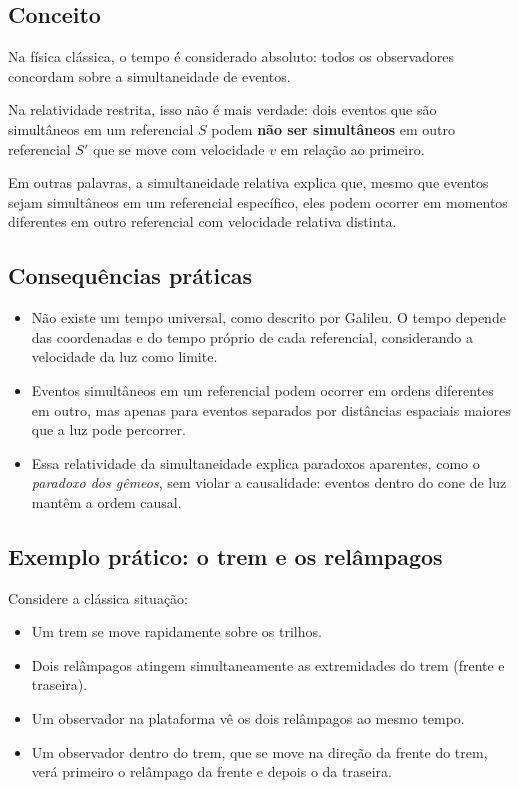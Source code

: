 \documentclass[12pt,a4paper]{article}
\begin{document}
\subsection{Conceito}

Na física clássica, o tempo é considerado absoluto: todos os observadores concordam sobre a simultaneidade de eventos.  

Na relatividade restrita, isso não é mais verdade: dois eventos que são simultâneos em um referencial $S$ podem \textbf{não ser simultâneos} em outro referencial $S'$ que se move com velocidade $v$ em relação ao primeiro.

Em outras palavras, a simultaneidade relativa explica que, mesmo que eventos sejam simultâneos em um referencial específico, eles podem ocorrer em momentos diferentes em outro referencial com velocidade relativa distinta.

\subsection{Consequências práticas}

\begin{itemize}
    \item Não existe um tempo universal, como descrito por Galileu. O tempo depende das coordenadas e do tempo próprio de cada referencial, considerando a velocidade da luz como limite.
    \item Eventos simultâneos em um referencial podem ocorrer em ordens diferentes em outro, mas apenas para eventos separados por distâncias espaciais maiores que a luz pode percorrer.
    \item Essa relatividade da simultaneidade explica paradoxos aparentes, como o \emph{paradoxo dos gêmeos}, sem violar a causalidade: eventos dentro do cone de luz mantêm a ordem causal.
\end{itemize}

\subsection{Exemplo prático: o trem e os relâmpagos}

Considere a clássica situação:

\begin{itemize}
    \item Um trem se move rapidamente sobre os trilhos.
    \item Dois relâmpagos atingem simultaneamente as extremidades do trem (frente e traseira).
    \item Um observador na plataforma vê os dois relâmpagos ao mesmo tempo.
    \item Um observador dentro do trem, que se move na direção da frente do trem, verá primeiro o relâmpago da frente e depois o da traseira.
\end{itemize}
\end{document}
